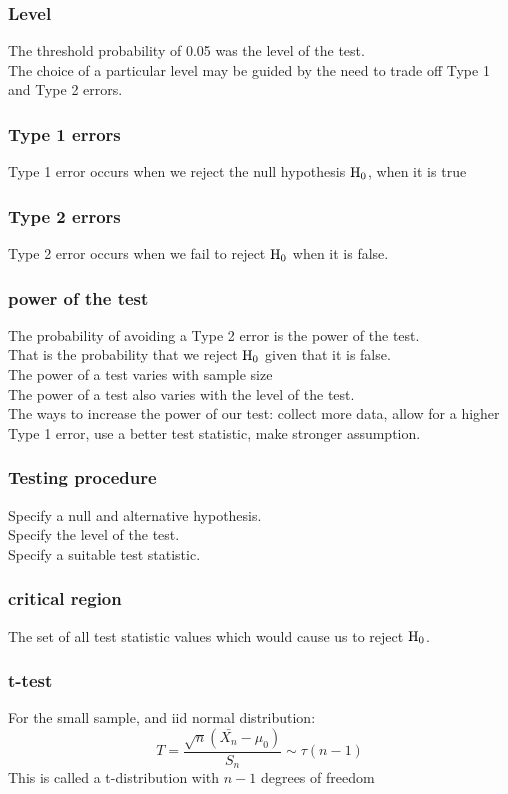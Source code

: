 \documentclass[12pt,a4paper]{article}
\begin{document}
\subsubsection*{Level}
The threshold probability of 0.05 was the level of the test.\\
The choice of a particular level may be guided by the need to trade off Type 1 and Type 2 errors.
\subsubsection*{Type 1 errors}
Type 1 error occurs when we reject the null hypothesis $\rm H_0$, when it is true
\subsubsection*{Type 2 errors}
Type 2 error occurs when we fail to reject $\rm H_0$ when it is false.
\subsubsection*{power of the test}
The probability of avoiding a Type 2 error is the power of the test.\\
That is the probability that we reject $\rm H_0$ given that it is false.\\
The power of a test varies with sample size\\
The power of a test also varies with the level of the test.\\
The ways to increase the power of our test: collect more data, allow for a higher Type 1 error, use a better test statistic, make stronger assumption.
\subsubsection*{Testing procedure}
Specify a null and alternative hypothesis.\\
Specify the level of the test.\\
Specify a suitable test statistic.\\
\subsubsection*{critical region}
The set of all test statistic values which would cause us to reject $\rm H_0$.
\subsubsection*{t-test}
For the small sample, and iid normal distribution:
$$
T = \frac{\sqrt{n}(\bar{X_n}-\mu_0)}{S_n} \sim \tau(n-1)
$$
This is called a t-distribution with $n-1$ degrees of freedom
\end{document}
